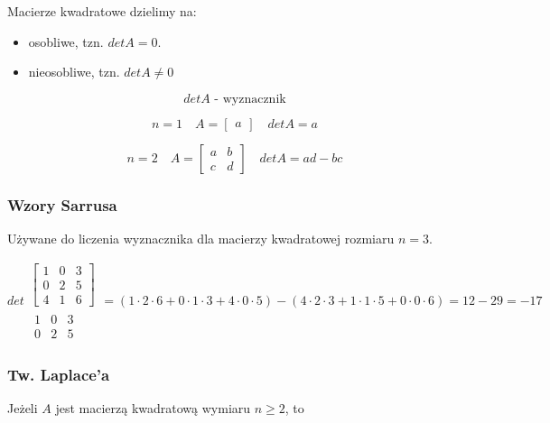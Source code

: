 \documentclass[../Matematyka.tex]{subfiles}
\begin{document}
    Macierze kwadratowe dzielimy na:
    \begin{itemize}
        \item osobliwe, tzn. \(detA = 0\).
        \item nieosobliwe, tzn. \(detA \neq 0\)
    \end{itemize}

    \[detA \text{ - wyznacznik}\]

    \begin{displaymath}
        n=1
        \quad
        A =
        \begin{bmatrix}
            a
        \end{bmatrix}
        \quad
        detA = a
    \end{displaymath}

    \begin{displaymath}
        n=2
        \quad
        A =
        \begin{bmatrix}
            a & b \\
            c & d
        \end{bmatrix}
        \quad
        detA = ad - bc
    \end{displaymath}

    \subsubsection{Wzory Sarrusa}
    Używane do liczenia wyznacznika dla macierzy kwadratowej rozmiaru \(n = 3\).

    \begin{displaymath}
        det
        \substack{
            \begin{bmatrix}
                1 & 0 & 3 \\
                0 & 2 & 5 \\
                4 & 1 & 6
            \end{bmatrix}\\
            \begin{matrix}
                1 & 0 & 3 \\
                0 & 2 & 5
            \end{matrix}
        } =
        (1 \cdot 2 \cdot 6 + 0 \cdot 1 \cdot 3 + 4 \cdot 0 \cdot 5) - (4 \cdot 2 \cdot 3 + 1 \cdot 1 \cdot 5 + 0 \cdot 0 \cdot 6) = 12 - 29 = -17
    \end{displaymath}

    \subsubsection{Tw. Laplace'a}
    Jeżeli \(A\) jest macierzą kwadratową wymiaru \(n \geq 2\), to 
\end{document}
